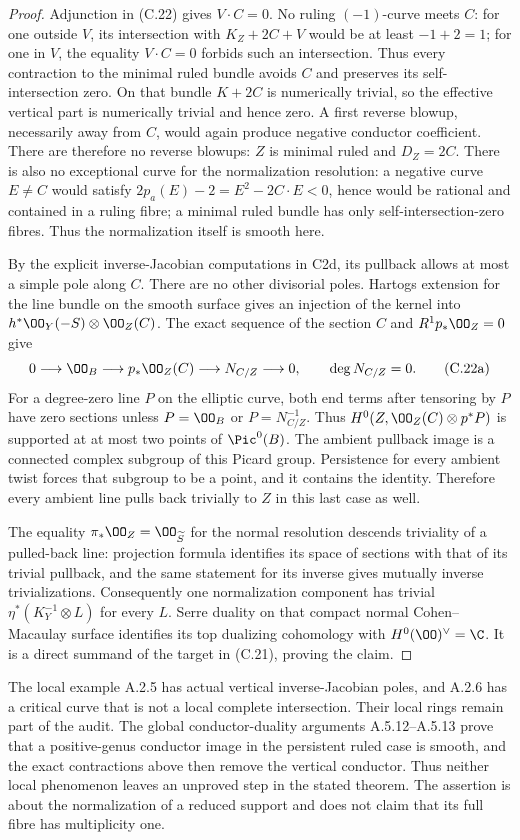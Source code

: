 \begin{proof}
Adjunction in (C.22) gives $V\cdot C=0$. No ruling $(-1)$-curve meets $C$: for one outside $V$, its intersection with $K_Z+2C+V$ would be at least $-1+2=1$; for one in $V$, the equality $V\cdot C=0$ forbids such an intersection. Thus every contraction to the minimal ruled bundle avoids $C$ and preserves its self-intersection zero. On that bundle $K+2C$ is numerically trivial, so the effective vertical part is numerically trivial and hence zero. A first reverse blowup, necessarily away from $C$, would again produce negative conductor coefficient. There are therefore no reverse blowups: $Z$ is minimal ruled and $D_Z=2C$. There is also no exceptional curve for the normalization resolution: a negative curve $E\ne C$ would satisfy $2p_a(E)-2=E^2-2C\cdot E<0$, hence would be rational and contained in a ruling fibre; a minimal ruled bundle has only self-intersection-zero fibres. Thus the normalization itself is smooth here.

By the explicit inverse-Jacobian computations in C2d, its pullback allows at most a simple pole along $C$. There are no other divisorial poles. Hartogs extension for the line bundle on the smooth surface gives an injection of the kernel into $h^*\OO_Y(-S)\otimes\OO_Z(C)$. The exact sequence of the section $C$ and $R^1p_*\OO_Z=0$ give
\[
 0\longrightarrow\OO_B\longrightarrow p_*\OO_Z(C)
   \longrightarrow N_{C/Z}\longrightarrow0,
 \qquad \deg N_{C/Z}=0.                              \tag{C.22a}
\]
For a degree-zero line $P$ on the elliptic curve, both end terms after tensoring by $P$ have zero sections unless $P=\OO_B$ or $P=N_{C/Z}^{-1}$. Thus $H^0(Z,\OO_Z(C)\otimes p^*P)$ is supported at at most two points of $\Pic^0(B)$. The ambient pullback image is a connected complex subgroup of this Picard group. Persistence for every ambient twist forces that subgroup to be a point, and it contains the identity. Therefore every ambient line pulls back trivially to $Z$ in this last case as well.

The equality $\pi_*\OO_Z=\OO_{\widetilde S}$ for the normal resolution descends triviality of a pulled-back line: projection formula identifies its space of sections with that of its trivial pullback, and the same statement for its inverse gives mutually inverse trivializations. Consequently one normalization component has trivial $\eta^*(K_Y^{-1}\otimes L)$ for every $L$. Serre duality on that compact normal Cohen--Macaulay surface identifies its top dualizing cohomology with $H^0(\OO)^\vee=\C$. It is a direct summand of the target in (C.21), proving the claim.
\end{proof}

The local example A.2.5 has actual vertical inverse-Jacobian
poles, and A.2.6 has a critical curve that is not a local
complete intersection. Their local rings remain part of the
audit. The global conductor-duality arguments A.5.12--A.5.13 prove
that a positive-genus conductor image in the persistent ruled
case is smooth, and the exact contractions above then remove
the vertical conductor. Thus neither local phenomenon leaves
an unproved step in the stated theorem. The assertion
is about the normalization of a reduced support and does not
claim that its full fibre has multiplicity one.



